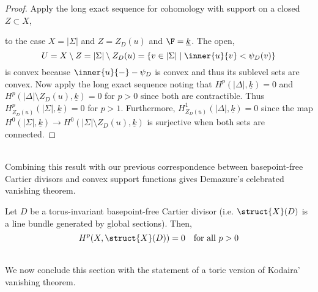 \documentclass[12pt]{article}
\begin{document}
\begin{proof}
Apply the long exact sequence for cohomology with support on a closed $Z \subset X$,
\begin{center}
\end{center}
to the case $X = | \Sigma |$ and $Z = Z_D(u)$ and $\F = \underline{k}$. The open, 
\[ U = X \setminus Z = |\Sigma| \setminus Z_D(u) = \{ v \in |\Sigma| \mid \inner{u}{v} < \psi_D(v) \} \]
is convex because $\inner{u}{-} - \psi_D$ is convex and thus its sublevel sets are convex. Now apply the long exact sequence noting that $H^p(|\Delta|, \underline{k}) = 0$ and $H^p(|\Delta| \setminus Z_D(u), \underline{k}) = 0$ for $p > 0$ since both are contractible. Thus $H^p_{Z_D(u)}(|\Sigma|, \underline{k}) = 0$ for $p > 1$. Furthermore, $H^1_{Z_D(u)}(|\Delta|, \underline{k}) = 0$ since the map $H^0(|\Sigma|, \underline{k}) \to H^0(|\Sigma| \setminus Z_D(u), \underline{k})$ is surjective when both sets are connected. 
\end{proof}
\noindent\\
Combining this result with our previous correspondence between basepoint-free Cartier divisors and convex support functions gives Demazure's celebrated vanishing theorem.

\begin{theorem}
Let $D$ be a torus-invariant basepoint-free Cartier divisor (i.e. $\struct{X}(D)$ is a line bundle generated by global sections). Then,
\[ H^p(X, \struct{X}(D)) = 0 \quad \text{for all } p > 0 \]
\end{theorem}
\noindent\\
We now conclude this section with the statement of a toric version of Kodaira' vanishing theorem.
\end{document}
